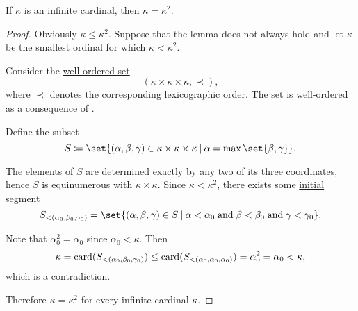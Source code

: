 \begin{lemma}\label{thm:square_of_infinite_cardinal}
  If \( \kappa \) is an infinite cardinal, then \( \kappa = \kappa^2 \).
\end{lemma}
\begin{proof}
  Obviously \( \kappa \leq \kappa^2 \). Suppose that the lemma does not always hold and let \( \kappa \) be the smallest ordinal for which \( \kappa < \kappa^2 \).

  Consider the \hyperref[def:well_ordered_set]{well-ordered set}
  \begin{equation*}
    (\kappa \times \kappa \times \kappa, \prec),
  \end{equation*}
  where \( \prec \) denotes the corresponding \hyperref[def:lexicographic_order]{lexicographic order}. The set is well-ordered as a consequence of .

  Define the subset
  \begin{equation*}
    S \coloneqq \set{ (\alpha, \beta, \gamma) \in \kappa \times \kappa \times \kappa \given \alpha = \max\set{ \beta, \gamma } }.
  \end{equation*}

  The elements of \( S \) are determined exactly by any two of its three coordinates, hence \( S \) is equinumerous with \( \kappa \times \kappa \). Since \( \kappa < \kappa^2 \), there exists some \hyperref[def:partially_ordered_set_interval/ray]{initial segment}
  \begin{equation*}
    S_{<(\alpha_0, \beta_0, \gamma_0)} = \set{ (\alpha, \beta, \gamma) \in S \given \alpha < \alpha_0 \T{and} \beta < \beta_0 \T{and} \gamma < \gamma_0 }.
  \end{equation*}

  Note that \( \alpha_0^2 = \alpha_0 \) since \( \alpha_0 < \kappa \). Then
  \begin{equation*}
    \kappa = \operatorname{card}(S_{<(\alpha_0, \beta_0, \gamma_0)}) \leq \operatorname{card}(S_{<(\alpha_0, \alpha_0, \alpha_0)}) = \alpha_0^2 = \alpha_0 < \kappa,
  \end{equation*}
  which is a contradiction.

  Therefore \( \kappa = \kappa^2 \) for every infinite cardinal \( \kappa \).
\end{proof}

